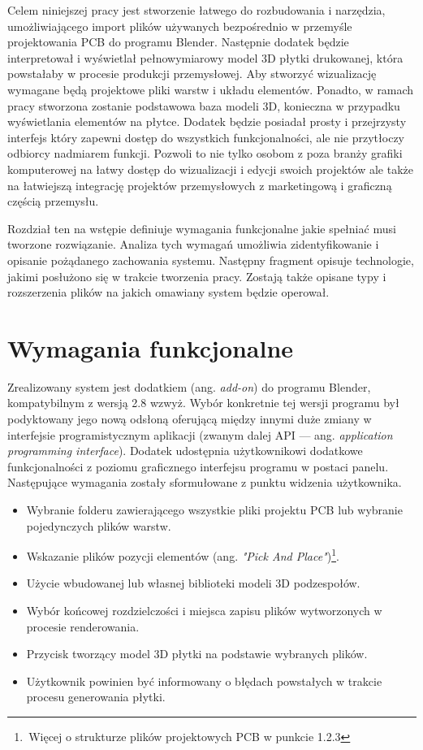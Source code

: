 \documentclass{xmgr}
\begin{document}
Celem niniejszej pracy jest stworzenie łatwego do rozbudowania i narzędzia, umożliwiającego import plików używanych bezpośrednio w przemyśle projektowania PCB do programu Blender. Następnie dodatek będzie interpretował i wyświetlał pełnowymiarowy model 3D płytki drukowanej, która powstałaby w procesie produkcji przemysłowej. Aby stworzyć wizualizację wymagane będą projektowe pliki warstw i układu elementów. Ponadto, w ramach pracy stworzona zostanie podstawowa baza modeli 3D, konieczna w przypadku wyświetlania elementów na płytce. Dodatek będzie posiadał prosty i przejrzysty interfejs który zapewni dostęp do wszystkich funkcjonalności, ale nie przytłoczy odbiorcy nadmiarem funkcji. Pozwoli to nie tylko osobom z poza branży grafiki komputerowej na łatwy dostęp do wizualizacji i edycji swoich projektów ale także na łatwiejszą integrację projektów przemysłowych z marketingową i graficzną częścią przemysłu.

Rozdział ten na wstępie definiuje wymagania funkcjonalne jakie spełniać musi tworzone rozwiązanie. Analiza tych wymagań umożliwia zidentyfikowanie i opisanie pożądanego zachowania systemu. Następny fragment opisuje technologie, jakimi posłużono się w trakcie tworzenia pracy. Zostają także opisane typy i rozszerzenia plików na jakich omawiany system będzie operował.
\newpage

\section{Wymagania funkcjonalne}

Zrealizowany system jest dodatkiem (ang. \emph{add-on}) do programu Blender, kompatybilnym z wersją 2.8 wzwyż. Wybór konkretnie tej wersji programu był podyktowany jego nową odsłoną oferującą między innymi duże zmiany w interfejsie programistycznym aplikacji (zwanym dalej API --- ang. \emph{application programming interface}). Dodatek udostępnia użytkownikowi dodatkowe funkcjonalności z poziomu graficznego interfejsu programu w postaci panelu. Następujące wymagania zostały sformułowane z punktu widzenia użytkownika.
\begin{itemize}
\item Wybranie folderu zawierającego wszystkie pliki projektu PCB lub wybranie pojedynczych plików warstw.
\item Wskazanie plików pozycji elementów (ang. \emph{"Pick And Place"})\footnote{\,Więcej o strukturze plików projektowych PCB w punkcie 1.2.3}.
\item Użycie wbudowanej lub własnej biblioteki modeli 3D podzespołów.
\item Wybór końcowej rozdzielczości i miejsca zapisu plików wytworzonych w procesie renderowania.
\item Przycisk tworzący model 3D płytki na podstawie wybranych plików.
\item Użytkownik powinien być informowany o błędach powstałych w trakcie procesu generowania płytki.
\end{itemize}
\end{document}
